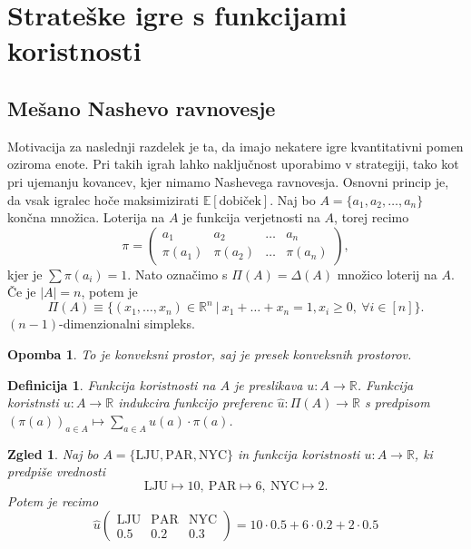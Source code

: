 \documentclass[10pt, a4paper]{article}
\newtheorem{defi}[izr]{Definicija}
\newenvironment{noticeB}{%
  \tcolorbox[%
  notitle,
  empty,
  enhanced,  %
  breakable,
  coltext=black,
  colback=white, 
  fontupper=\rmfamily,
  parbox=false,
  noparskip,
  sharp corners,
  boxrule=-1pt,  %
  frame hidden,
  left=7pt,  %
  right=7pt,
  top=5pt,
  bottom=5pt,
  before skip=2.5ex plus 2pt,
  after skip=2.5ex plus 2pt,
  borderline west = {1.5pt}{-0.1pt}{blue!30!black}, %
  overlay unbroken and last={%
    \draw[color=black, line width=1.25pt]
    ($(frame.south west)+(1.pt, -0.1pt)$) -- ++(2em, 0);
  }
  ]}
{\endtcolorbox}
\newenvironment{definicija}{\begin{defi}\begin{noticeB}}{%
    \end{noticeB}\end{defi}}
\newtheorem*{opomba}{Opomba}
\newtheorem{zgled}[izr]{Zgled}
\newcommand{\R}{\mathbb {R}}
\begin{document}
\section{Strateške igre s funkcijami koristnosti}

\subsection{Mešano Nashevo ravnovesje}

Motivacija za naslednji razdelek je ta, da imajo nekatere igre kvantitativni pomen oziroma enote.
Pri takih igrah lahko naključnost uporabimo v strategiji, tako kot pri ujemanju kovancev, kjer nimamo Nashevega ravnovesja.
Osnovni princip je, da vsak igralec hoče maksimizirati $\mathbb{E} [\text{dobiček}]$.
Naj bo $A = \{a_1, a_2, \dots, a_n\}$ končna množica. Loterija na $A$ je funkcija verjetnosti na $A$, torej recimo 
$$\pi = \begin{pmatrix}
  a_1 & a_2 & \dots & a_n\\
  \pi (a_1) & \pi (a_2) & \dots & \pi (a_n)
\end{pmatrix},$$
kjer je $\sum \pi (a_i) = 1$. Nato označimo s $\Pi (A) = \Delta(A)$ množico loterij na $A$.
Če je $|A| = n$, potem je $$\Pi(A) \equiv \{(x_1, \dots, x_n) \in \R^n\ |\ x_1 + \dots + x_n = 1, x_i \geq 0,\ \forall i \in [n]\}.$$
$(n - 1)$-dimenzionalni simpleks.

\begin{opomba}
  To je konveksni prostor, saj je presek konveksnih prostorov.
\end{opomba}

\begin{definicija}
  Funkcija koristnosti na $A$ je preslikava $u: A \to \R$.
  Funkcija koristnsti $u: A \to \R$ indukcira funkcijo preferenc $\hat{u} : \Pi(A) \to \R$
  s predpisom $(\pi(a))_{a \in A} \mapsto \sum_{a \in A} u(a) \cdot \pi (a)$.
\end{definicija}

\begin{zgled}
  Naj bo $A = \{\mathrm{LJU}, \mathrm{PAR}, \mathrm{NYC}\}$ in funkcija koristnosti 
  $u: A \to \R$, ki predpiše vrednosti
  $$\mathrm{LJU} \mapsto 10,\ \mathrm{PAR} \mapsto 6,\ \mathrm{NYC} \mapsto 2.$$
  Potem je recimo 
  $$\hat{u} \begin{pmatrix}
    \mathrm{LJU} & \mathrm{PAR} & \mathrm{NYC}\\
    0.5 & 0.2 & 0.3
  \end{pmatrix} = 10 \cdot 0.5 + 6 \cdot 0.2 + 2 \cdot  0.5$$
\end{zgled}
\end{document}
